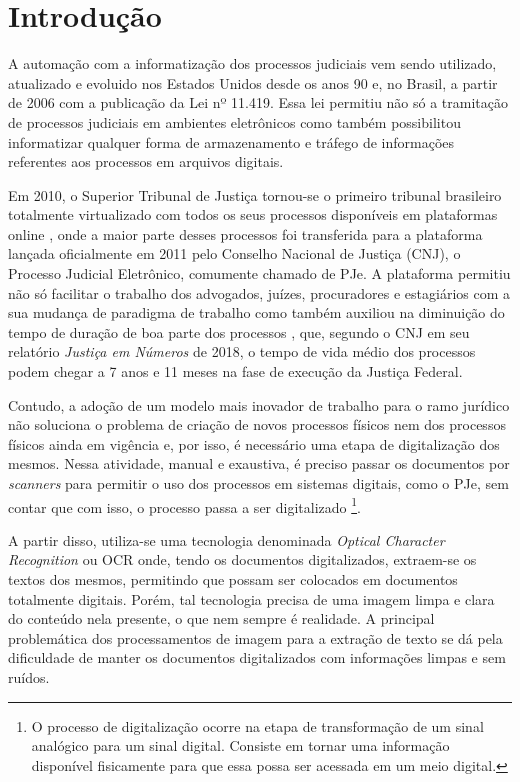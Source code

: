 \chapter[Introdução]{Introdução}

A automação com a informatização dos processos judiciais vem sendo utilizado, atualizado e evoluido nos Estados Unidos desde os anos 90 \cite{automating-judicial-doc} e, no Brasil, a partir de 2006 com a publicação da Lei nº 11.419. Essa lei permitiu não só a tramitação de processos judiciais em ambientes eletrônicos \cite{digitalizacao-de-proc-judiciais} como também possibilitou informatizar qualquer forma de armazenamento e tráfego de informações referentes aos processos em arquivos digitais.

Em 2010, o Superior Tribunal de Justiça tornou-se o primeiro tribunal brasileiro totalmente virtualizado com todos os seus processos disponíveis em plataformas online \cite{digitalizacao-de-proc-judiciais}, onde a maior parte desses processos foi transferida para a plataforma lançada oficialmente em 2011 pelo Conselho Nacional de Justiça (CNJ), o Processo Judicial Eletrônico, comumente chamado de PJe. A plataforma permitiu não só facilitar o trabalho dos advogados, juízes, procuradores e estagiários com a sua mudança de paradigma de trabalho como também auxiliou na diminuição do tempo de duração de boa parte dos processos \cite{pje-diminuicao-tempo-do=proc}, que, segundo o CNJ em seu relatório \textit{Justiça em Números} de 2018, o tempo de vida médio dos processos podem chegar a 7 anos e 11 meses na fase de execução da Justiça Federal.

Contudo, a adoção de um modelo mais inovador de trabalho para o ramo jurídico não soluciona o problema de criação de novos processos físicos nem dos processos físicos ainda em vigência e, por isso, é necessário uma etapa de digitalização dos mesmos. Nessa atividade, manual e exaustiva, é preciso passar os documentos por \textit{scanners} para permitir o uso dos processos em sistemas digitais, como o PJe, sem contar que com isso, o processo passa a ser digitalizado
    \footnote{
        O processo de digitalização ocorre na etapa de transformação de um sinal analógico para um sinal digital. Consiste em tornar uma informação disponível fisicamente para que essa possa ser acessada em um meio digital.
    }.

A partir disso, utiliza-se uma tecnologia denominada \textit{Optical Character Recognition} ou OCR onde, tendo os documentos digitalizados, extraem-se os textos dos mesmos, permitindo que possam ser colocados em documentos totalmente digitais. Porém, tal tecnologia precisa de uma imagem limpa e clara do conteúdo nela presente, o que nem sempre é realidade. A principal problemática dos processamentos de imagem para a extração de texto se dá pela dificuldade de manter os documentos digitalizados com informações limpas e sem ruídos.


